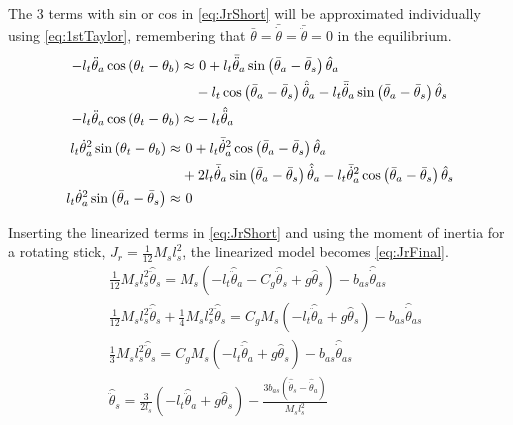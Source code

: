 		The 3 terms with sin or cos in \autoref{eq:JrShort} will be approximated individually using \autoref{eq:1stTaylor}, remembering that $\bar{\theta}=\bar{\dot{\theta}}=\bar{\ddot{\theta}}=0$ in the equilibrium.
		\begin{subequations}
			\begin{flalign}
				-l_t\ddot{\theta}_a\cos\left(\theta_t-\theta_b\right)  \approx & \ 0 + l_t\bar{\ddot{\theta}}_a\sin\left(\bar{\theta}_a-\bar{\theta}_s\right)\hat{\theta}_a  \notag \\ 
				& -l_t\cos\left(\bar{\theta}_a-\bar{\theta}_s\right)\hat{\ddot{\theta}}_a - l_t\bar{\ddot{\theta}}_a\sin\left(\bar{\theta}_a-\bar{\theta}_s\right)\hat{\theta}_s   \\
				-l_t\ddot{\theta}_a\cos\left(\theta_t-\theta_b\right) \approx &-l_t\hat{\ddot{\theta}}_a 
			\end{flalign} %
		\end{subequations}
		\begin{subequations}
			\begin{flalign}
				l_t\dot{\theta}_a^2\sin\left(\theta_t-\theta_b\right)  \approx &\ 0 + l_t\bar{\dot{\theta}}_a^2\cos\left(\bar{\theta}_a-\bar{\theta}_s\right)\hat{\theta}_a  \notag \\
				& + 2l_t\bar{\dot{\theta}}_a\sin\left(\bar{\theta}_a-\bar{\theta}_s\right)\hat{\dot{\theta}}_a-l_t\bar{\dot{\theta}}_a^2\cos\left(\bar{\theta}_a-\bar{\theta}_s\right)\hat{\theta}_s   \\
				l_t\dot{\theta}_a^2\sin\left(\bar{\theta}_a-\bar{\theta}_s\right) \approx & \ 0 
			\end{flalign}
		\end{subequations}
		
		Inserting the linearized terms in \autoref{eq:JrShort} and using the moment of inertia for a rotating stick, $J_r=\frac{1}{12}M_sl_s^2$, the linearized model becomes \eqref{eq:JrFinal}.
		\begin{subequations}
			\begin{flalign}
				& \frac{1}{12}M_sl_s^2\hat{\ddot{\theta}}_s= M_s\left(-l_t\hat{\ddot{\theta}}_a-C_g\hat{\ddot{\theta}}_s+g\hat{\theta}_s\right)-b_{as}\hat{\dot{\theta}}_{as}   \\
				& \frac{1}{12}M_sl_s^2\hat{\ddot{\theta}}_s+\frac{1}{4}M_sl_s^2\hat{\ddot{\theta}}_s=C_gM_s\left(-l_t\hat{\ddot{\theta}}_a+g\hat{\theta}_s\right)-b_{as}\hat{\dot{\theta}}_{as}   \\
				& \frac{1}{3}M_sl_s^2\hat{\ddot{\theta}}_s=C_gM_s\left(-l_t\hat{\ddot{\theta}}_a+g\hat{\theta}_s\right)-b_{as}\hat{\dot{\theta}}_{as}  \label{eq:TauSmLin} \\
				& \hat{\ddot{\theta}}_s=\frac{3}{2l_s}\left(-l_t\hat{\ddot{\theta}}_a+g\hat{\theta}_s\right)-\frac{3b_{as}\left(\hat{\dot{\theta}}_s-\hat{\dot{\theta}}_a\right)}{M_sl_s^2} \label{eq:JrFinal}
			\end{flalign}
		\end{subequations}
		
